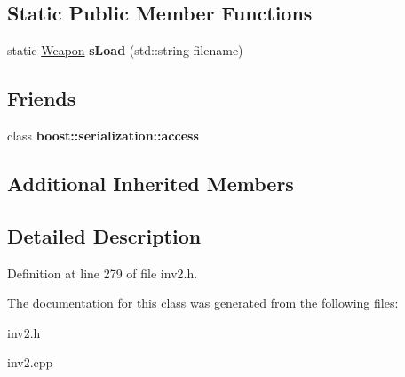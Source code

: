 \subsection*{Static Public Member Functions}
\begin{DoxyCompactItemize}
\item 
\hypertarget{class_weapon_a4dd598f04fed0db98db6e4d4a3cd8e23}{}\label{class_weapon_a4dd598f04fed0db98db6e4d4a3cd8e23} 
static \hyperlink{class_weapon}{Weapon} {\bfseries s\+Load} (std\+::string filename)
\end{DoxyCompactItemize}
\subsection*{Friends}
\begin{DoxyCompactItemize}
\item 
\hypertarget{class_weapon_ac98d07dd8f7b70e16ccb9a01abf56b9c}{}\label{class_weapon_ac98d07dd8f7b70e16ccb9a01abf56b9c} 
class {\bfseries boost\+::serialization\+::access}
\end{DoxyCompactItemize}
\subsection*{Additional Inherited Members}


\subsection{Detailed Description}


Definition at line 279 of file inv2.\+h.



The documentation for this class was generated from the following files\+:\begin{DoxyCompactItemize}
\item 
inv2.\+h\item 
inv2.\+cpp\end{DoxyCompactItemize}
